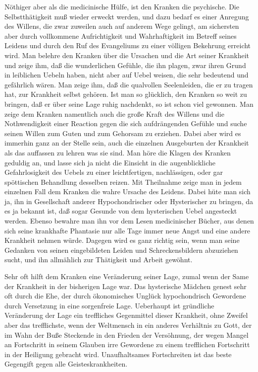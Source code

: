 Nöthiger aber als die medicinische Hülfe, ist den Kranken die psychische. Die Selbstthätigkeit muß wieder erweckt werden, und dazu bedarf es einer Anregung des Willens, die zwar zuweilen auch auf anderem Wege gelingt, am sichersten aber durch vollkommene Aufrichtigkeit und Wahrhaftigkeit im Betreff seines Leidens und durch den Ruf des Evangeliums zu einer völligen Bekehrung erreicht wird. Man belehre den Kranken über die Ursachen und die Art seiner Krankheit und zeige ihm, daß die wunderlichen Gefühle, die ihn plagen, zwar ihren Grund in leiblichen Uebeln haben, nicht aber auf Uebel weisen, die sehr bedeutend und gefährlich wären. Man zeige ihm, daß die qualvollen Seelenleiden, die er zu tragen hat, zur Krankheit selbst gehören. Ist man so glücklich, den Kranken so weit zu bringen, daß er über seine Lage ruhig nachdenkt, so ist schon viel gewonnen. Man zeige dem Kranken namentlich auch die große Kraft des Willens und die Nothwendigkeit einer Reaction gegen die sich aufdrängenden Gefühle und suche seinen Willen zum Guten und zum Gehorsam zu erziehen. Dabei aber wird es immerhin ganz an der Stelle sein, auch die einzelnen Ausgeburten der Krankheit als das auffassen zu lehren was sie sind. Man höre die Klagen des Kranken geduldig an, und lasse sich ja nicht die Einsicht in die augenblickliche Gefahrlosigkeit des Uebels zu einer leichtfertigen, nachlässigen, oder gar spöttischen Behandlung desselben reizen. Mit Theilnahme zeige man in jedem einzelnen Fall dem Kranken die wahre Ursache des Leidens. Dabei hüte man sich ja, ihn in Gesellschaft anderer Hypochondrischer oder Hysterischer zu bringen, da es ja bekannt ist, daß sogar Gesunde
von dem hysterischen Uebel angesteckt werden. Ebenso bewahre man ihn vor dem Lesen medicinischer Bücher, aus denen sich seine krankhafte Phantasie nur alle Tage immer neue Angst und eine andere Krankheit nehmen würde. Dagegen wird es ganz richtig sein, wenn man seine Gedanken von seinen eingebildeten Leiden und Schreckensbildern abzuziehen sucht, und ihn allmählich zur Thätigkeit und Arbeit gewöhnt.

Sehr oft hilft dem Kranken eine Veränderung seiner Lage, zumal wenn der Same der Krankheit in der bisherigen Lage war. Das hysterische Mädchen genest sehr oft durch die Ehe, der durch ökonomisches Unglück hypochondrisch Gewordene durch Versetzung in eine sorgenfreie Lage. Ueberhaupt ist gründliche Veränderung der Lage ein treffliches Gegenmittel dieser Krankheit, ohne Zweifel aber das trefflichste, wenn der Weltmensch in ein anderes Verhältnis zu Gott, der im Wahn der Buße Steckende in den Frieden der Versöhnung, der wegen Mangel an Fortschritt in seinem Glauben irre Gewordene zu einem trefflichen Fortschritt in der Heiligung gebracht wird. Unaufhaltsames Fortschreiten ist das beste Gegengift gegen alle Geisteskrankheiten.

